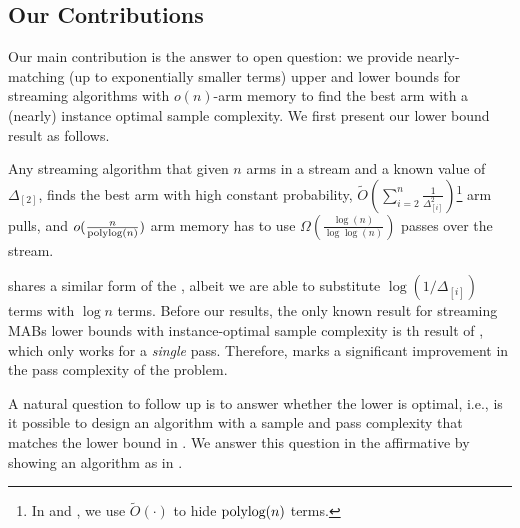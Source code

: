 \subsection{Our Contributions}
\label{sec:contribution}
Our main contribution is the answer to open question: we provide nearly-matching (up to exponentially smaller terms) upper and lower bounds for streaming algorithms with $o(n)$-arm memory to find the best arm with a (nearly) instance optimal sample complexity. We first present our lower bound result as follows.

\begin{result}
	\label{rst:main-lb}
	\vspace{-3pt}
	Any streaming algorithm that given $n$ arms in  a stream and a known value of $\Delta_{[2]}$, finds the best arm with high constant probability, $\tilde{O}(\sum_{i=2}^{n}\frac{1}{\Delta^2_{[i]}})$\footnote{In  and , we use $\tilde{O}(\cdot)$ to hide $\textnormal{polylog}(n)$ terms.} arm pulls, and $o(\frac{n}{\textnormal{polylog}(n)})$ arm memory has to use $\Omega(\frac{\log(n)}{\log\log(n)})$ passes over the stream.
\end{result}

 shares a similar form of the \cite{AW23BestArm}, albeit we are able to substitute $\log(1/\Delta_{[i]})$ terms with $\log{n}$ terms. Before our results, the only known result for streaming MABs lower bounds with instance-optimal sample complexity is th result of \cite{AWneurips22}, which only works for a \emph{single} pass. Therefore,  marks a significant improvement in the pass complexity of the problem.

A natural question to follow up  is to answer whether the lower is optimal, i.e., is it possible to design an algorithm with a sample and pass complexity that matches the lower bound in . We answer this question in the affirmative by showing an algorithm as in .

